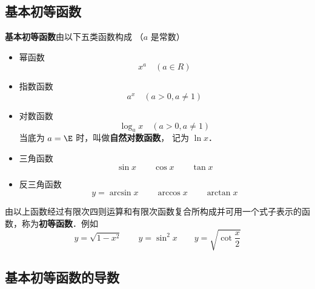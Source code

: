 

\subsection{基本初等函数}
\textbf{基本初等函数}由以下五类函数构成 （$a$ 是常数）

\begin{itemize}
\item 幂函数
\begin{equation}
{x^a} \quad(a \in R)
\end{equation}
\item 指数函数
\begin{equation}
{a^x} \quad(a > 0 , a \ne 1)
\end{equation}
\item 对数函数
\begin{equation}
{\log _a}x \quad(a > 0 , a \ne 1)
\end{equation}
当底为 $a = \E$ 时，叫做\textbf{自然对数函数}， 记为 $\ln x$． \\
\item 三角函数
\begin{equation}
\sin x \qquad  \cos x \qquad \tan x
\end{equation}
\item 反三角函数
\begin{equation}
y = \arcsin x  \qquad \arccos x  \qquad \arctan x
\end{equation}
\end{itemize}

由以上函数经过有限次四则运算和有限次函数复合所构成并可用一个式子表示的函数，称为\textbf{初等函数}．例如
\begin{equation}
y = \sqrt {1 - {x^2}}\qquad y = {\sin ^2}x\qquad y = \sqrt {\cot \frac{x}{2}} 
\end{equation}



\subsection{基本初等函数的导数}


